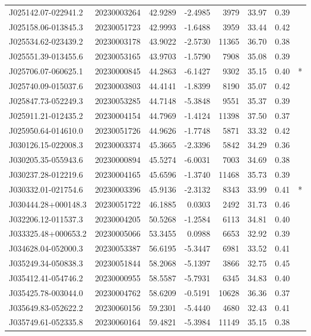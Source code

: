 \documentclass{article}
\begin{document}
\begin {longtable}{|l|l|r|r|r|r|r|l|}
 J025142.07-022941.2&  20230003264&   42.9289&   -2.4985&  3979& 33.97& 0.39&\\
 J025158.06-013845.3&  20230051723&   42.9993&   -1.6488&  3959& 33.44& 0.42&\\
 J025534.62-023439.2&  20230003178&   43.9022&   -2.5730& 11365& 36.70& 0.38&\\
 J025551.39-013455.6&  20230053165&   43.9703&   -1.5790&  7908& 35.08& 0.39&\\
 J025706.07-060625.1&  20230000845&   44.2863&   -6.1427&  9302& 35.15& 0.40&*\\%
 J025740.09-015037.6&  20230003803&   44.4141&   -1.8399&  8190& 35.07& 0.42&\\
 J025847.73-052249.3&  20230053285&   44.7148&   -5.3848&  9551& 35.37& 0.39&\\
 J025911.21-012435.2&  20230004154&   44.7969&   -1.4124& 11398& 37.50& 0.37&\\
 J025950.64-014610.0&  20230051726&   44.9626&   -1.7748&  5871& 33.32& 0.42&\\
 J030126.15-022008.3&  20230003374&   45.3665&   -2.3396&  5842& 34.29& 0.36&\\
 J030205.35-055943.6&  20230000894&   45.5274&   -6.0031&  7003& 34.69& 0.38&\\
 J030237.28-012219.6&  20230004165&   45.6596&   -1.3740& 11468& 35.73& 0.39&\\
 J030332.01-021754.6&  20230003396&   45.9136&   -2.3132&  8343& 33.99& 0.41&*\\%
 J030444.28+000148.3&  20230051722&   46.1885&    0.0303&  2492& 31.73& 0.46&\\
 J032206.12-011537.3&  20230004205&   50.5268&   -1.2584&  6113& 34.81& 0.40&\\
 J033325.48+000653.2&  20230005066&   53.3455&    0.0988&  6653& 32.92& 0.39&\\
 J034628.04-052000.3&  20230053387&   56.6195&   -5.3447&  6981& 33.52& 0.41&\\
 J035249.34-050838.3&  20230051844&   58.2068&   -5.1397&  3866& 32.75& 0.45&\\
 J035412.41-054746.2&  20230000955&   58.5587&   -5.7931&  6345& 34.83& 0.40&\\
 J035425.78-003044.0&  20230004762&   58.6209&   -0.5191& 10628& 36.36& 0.37&\\
 J035649.83-052622.2&  20230060156&   59.2301&   -5.4440&  4680& 32.43& 0.41&\\
 J035749.61-052335.8&  20230060164&   59.4821&   -5.3984& 11149& 35.15& 0.38&\\

\end{longtable}
\end{document}
